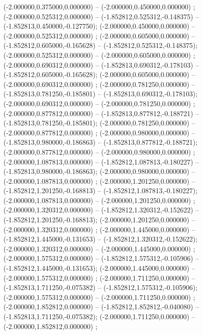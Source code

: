  (-2.000000,0.375000,0.000000) -- (-2.000000,0.450000,0.000000) ;
 (-2.000000,0.525312,0.000000) -- (-1.852812,0.525312,-0.148375) -- (-1.852813,0.450000,-0.127750);
 (-2.000000,0.450000,0.000000) -- (-2.000000,0.525312,0.000000) ;
 (-2.000000,0.605000,0.000000) -- (-1.852812,0.605000,-0.165628) -- (-1.852812,0.525312,-0.148375);
 (-2.000000,0.525312,0.000000) -- (-2.000000,0.605000,0.000000) ;
 (-2.000000,0.690312,0.000000) -- (-1.852813,0.690312,-0.178103) -- (-1.852812,0.605000,-0.165628);
 (-2.000000,0.605000,0.000000) -- (-2.000000,0.690312,0.000000) ;
 (-2.000000,0.781250,0.000000) -- (-1.852813,0.781250,-0.185801) -- (-1.852813,0.690312,-0.178103);
 (-2.000000,0.690312,0.000000) -- (-2.000000,0.781250,0.000000) ;
 (-2.000000,0.877812,0.000000) -- (-1.852813,0.877812,-0.188721) -- (-1.852813,0.781250,-0.185801);
 (-2.000000,0.781250,0.000000) -- (-2.000000,0.877812,0.000000) ;
 (-2.000000,0.980000,0.000000) -- (-1.852813,0.980000,-0.186863) -- (-1.852813,0.877812,-0.188721);
 (-2.000000,0.877812,0.000000) -- (-2.000000,0.980000,0.000000) ;
 (-2.000000,1.087813,0.000000) -- (-1.852812,1.087813,-0.180227) -- (-1.852813,0.980000,-0.186863);
 (-2.000000,0.980000,0.000000) -- (-2.000000,1.087813,0.000000) ;
 (-2.000000,1.201250,0.000000) -- (-1.852812,1.201250,-0.168813) -- (-1.852812,1.087813,-0.180227);
 (-2.000000,1.087813,0.000000) -- (-2.000000,1.201250,0.000000) ;
 (-2.000000,1.320312,0.000000) -- (-1.852812,1.320312,-0.152622) -- (-1.852812,1.201250,-0.168813);
 (-2.000000,1.201250,0.000000) -- (-2.000000,1.320312,0.000000) ;
 (-2.000000,1.445000,0.000000) -- (-1.852812,1.445000,-0.131653) -- (-1.852812,1.320312,-0.152622);
 (-2.000000,1.320312,0.000000) -- (-2.000000,1.445000,0.000000) ;
 (-2.000000,1.575312,0.000000) -- (-1.852812,1.575312,-0.105906) -- (-1.852812,1.445000,-0.131653);
 (-2.000000,1.445000,0.000000) -- (-2.000000,1.575312,0.000000) ;
 (-2.000000,1.711250,0.000000) -- (-1.852813,1.711250,-0.075382) -- (-1.852812,1.575312,-0.105906);
 (-2.000000,1.575312,0.000000) -- (-2.000000,1.711250,0.000000) ;
 (-2.000000,1.852812,0.000000) -- (-1.852812,1.852812,-0.040080) -- (-1.852813,1.711250,-0.075382);
 (-2.000000,1.711250,0.000000) -- (-2.000000,1.852812,0.000000) ;
